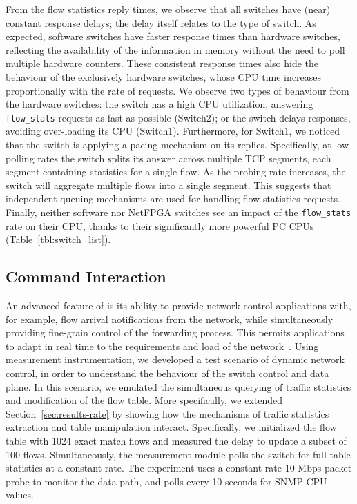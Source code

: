 From the flow statistics reply times, we observe that all switches have
(near) constant response delays; the delay itself relates to the type of switch.
As expected, software switches have faster response times than hardware
switches, reflecting the availability of the information in memory without the
need to poll multiple hardware counters. These consistent response times also
hide the behaviour of the exclusively hardware switches, whose CPU time increases
proportionally with the rate of requests.  We observe two types of behaviour from
the hardware switches: the switch has a high CPU utilization, answering
\texttt{flow\_stats} requests as fast as possible (Switch2); or the switch delays
responses, avoiding over-loading its CPU (Switch1). Furthermore, for Switch1, we
noticed that the switch is applying a pacing mechanism on its replies.
Specifically, at low polling rates the switch splits its answer across multiple
TCP segments, each segment containing statistics for a single flow.  As the
probing rate increases, the switch will aggregate multiple flows into a single
segment. This suggests that independent queuing mechanisms are used for handling
flow statistics requests. Finally, neither software nor NetFPGA switches see an
impact of the \texttt{flow\_stats} rate on their CPU, thanks to their significantly more
powerful PC CPUs (Table~\ref{tbl:switch_list}).

\subsection{\of Command Interaction}\label{sec:results-interactions}


An advanced feature of \of is its ability to provide network
control applications with, for example, flow arrival notifications from the network,
while simultaneously providing fine-grain control of the forwarding process.
This permits applications to adapt in real time to the requirements and load of
the network~. Using \oflops measurement
instrumentation, we developed a test scenario of dynamic network control, in order
to understand the behaviour of the switch control and data plane.  In this
scenario, we emulated the simultaneous querying of traffic statistics and
modification of the flow table.  More specifically, we extended
Section~\ref{sec:results-rate} by showing how the mechanisms of traffic
statistics extraction and table manipulation interact. Specifically, we
initialized the flow table with 1024 exact match flows and measured the delay to
update a subset of 100 flows.  Simultaneously, the measurement module polls the
switch for full table statistics at a constant rate. The experiment uses a
constant rate 10 Mbps packet probe to monitor the data path, and polls every 10
seconds for SNMP CPU values.

